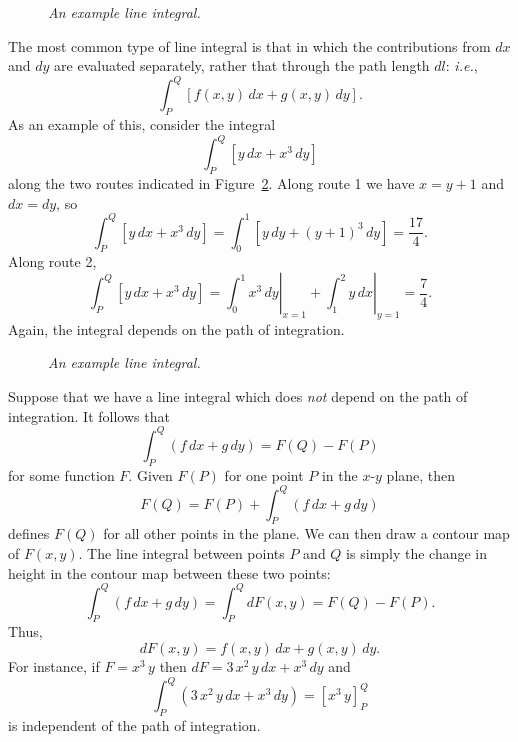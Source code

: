 \begin{figure}
\epsfysize=1.75in
\centerline{}
\caption{\em An example line integral.}\label{f11}
\end{figure}

The most common type of line integral is that in which the contributions from $dx$ and $dy$ are evaluated
separately, rather that through the path length $dl$: {\em i.e.}, 
\begin{equation}
\int_P^Q \left[ f(x,y)\,dx + g(x,y)\,dy\right].
\end{equation}
As an example of this, consider the integral
\begin{equation}
\int_P^Q \left[ y\,dx + x^3\,dy\right]
\end{equation}
along the two routes indicated in Figure~\ref{f12}.
Along route 1 we have $x=y+1$ and $dx=dy$, so
\begin{equation}
\int_P^Q \left[ y\,dx + x^3\,dy\right]= \int_{0}^1\left[y\,dy + (y+1)^3\,dy\right] = \frac{17}{4}.
\end{equation}
Along route 2,
\begin{equation}
\int_P^Q \left[ y\,dx + x^3\,dy\right]= \left.\int_0^1 x^3\,dy\right|_{x=1} + \left.\int_1^2 y\,dx\right|_{y=1} = \frac{7}{4}.
\end{equation}
Again, the integral depends on the path of integration. 

\begin{figure}
\epsfysize=1.75in
\centerline{}
\caption{\em An example line integral.}\label{f12}
\end{figure}

Suppose that we have a line integral which does {\em not}\/ depend on the path of integration. It
follows that
\begin{equation}
\int_P^Q \left(f\,dx + g\,dy\right) = F(Q) - F(P)
\end{equation}
for some function $F$. Given $F(P)$ for one point $P$ in the $x$-$y$ plane, then
\begin{equation}
F(Q) = F(P) + \int_P^Q \left(f\,dx + g\,dy\right)
\end{equation}
defines $F(Q)$ for all other points in the plane. We can then draw a contour map of $F(x,y)$.
The line integral between points $P$ and $Q$ is simply the change in height in the contour
map between these two points:
\begin{equation}
\int_P^Q \left(f\,dx + g\,dy\right) = \int_P^Q dF(x,y) = F(Q) - F(P).
\end{equation}
Thus,
\begin{equation}
dF(x,y) = f(x,y)\,dx + g(x,y)\,dy.
\end{equation}
For instance, if $F=x^3\,y$ then $dF= 3\,x^2\,y\,dx + x^3\,dy$ and 
\begin{equation}
\int_P^Q \left(3\,x^2\,y\,dx + x^3\,dy\right) = \left[x^3\,y\right]_P^Q 
\end{equation}
is independent of the path of integration. 

